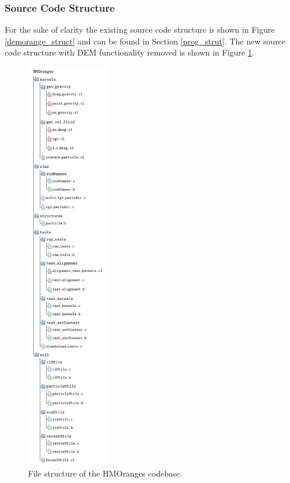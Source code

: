 \documentclass[../Interim_Report_Master]{subfiles}
\begin{document}
\subsubsection{Source Code Structure}
For the sake of clarity the existing source code structure is shown in Figure \ref{demorange_struct} and can be found in Section \ref{prog_strut}. The new source code structure with DEM functionality removed is shown in Figure \ref{hmorange_struct}. 
\begin{figure}
	\centering
	\includegraphics*[width=0.32\textwidth, trim=0 0 0 0, clip]{./Diagrams/HMOranges_Structure/HMOranges_Structure.pdf}
		\caption{File structure of the HMOranges codebase.}
	\label{hmorange_struct}
\end{figure}
\end{document}
